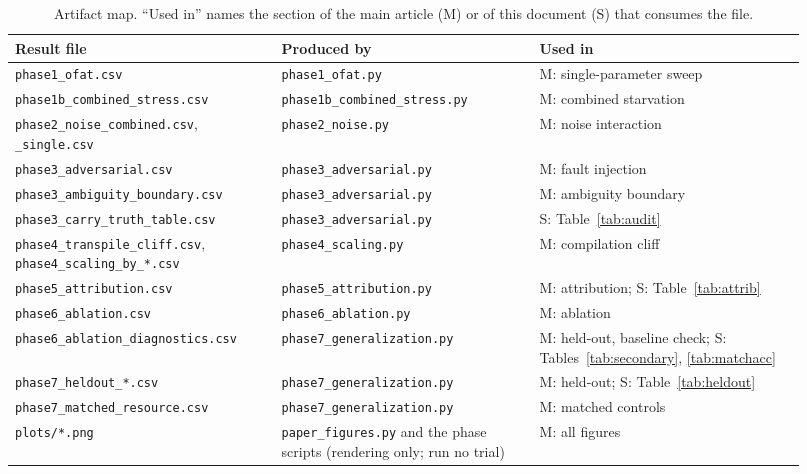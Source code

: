 \documentclass[preprint,11pt]{elsarticle}
\begin{document}
\begin{table}[h]
\centering\small
\caption{Artifact map. ``Used in'' names the section of the main article
(M) or of this document (S) that consumes the file.}
\label{tab:artifacts}
\scriptsize
\begin{tabular}{@{}>{\raggedright\arraybackslash}p{0.31\linewidth}>{\raggedright\arraybackslash}p{0.30\linewidth}>{\raggedright\arraybackslash}p{0.31\linewidth}@{}}
\toprule
Result file & Produced by & Used in \\
\midrule
\texttt{phase1\_\allowbreak{}ofat.csv} & \texttt{phase1\_\allowbreak{}ofat.py} & M: single-parameter sweep \\
\texttt{phase1b\_\allowbreak{}combined\_\allowbreak{}stress.csv} & \texttt{phase1b\_\allowbreak{}combined\_\allowbreak{}stress.py} & M: combined starvation \\
\texttt{phase2\_\allowbreak{}noise\_\allowbreak{}combined.csv}, \texttt{\_\allowbreak{}single.csv} & \texttt{phase2\_\allowbreak{}noise.py} & M: noise interaction \\
\texttt{phase3\_\allowbreak{}adversarial.csv} & \texttt{phase3\_\allowbreak{}adversarial.py} & M: fault injection \\
\texttt{phase3\_\allowbreak{}ambiguity\_\allowbreak{}boundary.csv} & \texttt{phase3\_\allowbreak{}adversarial.py} & M: ambiguity boundary \\
\texttt{phase3\_\allowbreak{}carry\_\allowbreak{}truth\_\allowbreak{}table.csv} & \texttt{phase3\_\allowbreak{}adversarial.py} & S: Table~\ref{tab:audit} \\
\texttt{phase4\_\allowbreak{}transpile\_\allowbreak{}cliff.csv}, \texttt{phase4\_\allowbreak{}scaling\_\allowbreak{}by\_\allowbreak{}*.csv} & \texttt{phase4\_\allowbreak{}scaling.py} & M: compilation cliff \\
\texttt{phase5\_\allowbreak{}attribution.csv} & \texttt{phase5\_\allowbreak{}attribution.py} & M: attribution; S: Table~\ref{tab:attrib} \\
\texttt{phase6\_\allowbreak{}ablation.csv} & \texttt{phase6\_\allowbreak{}ablation.py} & M: ablation \\
\texttt{phase6\_\allowbreak{}ablation\_\allowbreak{}diagnostics.csv} & \texttt{phase7\_\allowbreak{}generalization.py} & M: held-out, baseline check; S: Tables~\ref{tab:secondary}, \ref{tab:matchacc} \\
\texttt{phase7\_\allowbreak{}heldout\_\allowbreak{}*.csv} & \texttt{phase7\_\allowbreak{}generalization.py} & M: held-out; S: Table~\ref{tab:heldout} \\
\texttt{phase7\_\allowbreak{}matched\_\allowbreak{}resource.csv} & \texttt{phase7\_\allowbreak{}generalization.py} & M: matched controls \\
\midrule
\texttt{plots/*.png} & \texttt{paper\_\allowbreak{}figures.py} and the phase scripts (rendering only; run no trial) & M: all figures \\
\bottomrule
\end{tabular}
\end{table}
\end{document}
